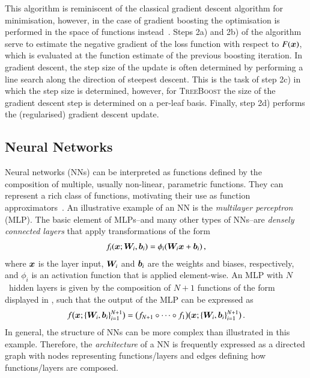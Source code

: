 This algorithm is reminiscent of the classical gradient descent algorithm for
minimisation, however, in the case of gradient boosting the optimisation is
performed in the space of functions instead~\cite{Friedman:2001wbq}. Steps 2a)
and 2b) of the algorithm serve to estimate the negative gradient of the loss
function with respect to $F(\bm{x})$, which is evaluated at the function
estimate of the previous boosting iteration. In gradient descent, the step size
of the update is often determined by performing a line search along the
direction of steepest descent. This is the task of step 2c) in which the step
size is determined, however, for \textsc{TreeBoost} the size of the gradient
descent step is determined on a per-leaf basis. Finally, step 2d) performs the
(regularised) gradient descent update.


\subsection{Neural Networks}%
\label{sec:neural_networks}

Neural networks (NNs) can be interpreted as functions defined by the composition
of multiple, usually non-linear, parametric functions. They can represent a rich
class of functions, motivating their use as function
approximators~\cite{hornik1989multilayer}. An illustrative example of an NN is
the \emph{multilayer perceptron} (MLP). The basic element of MLPs--and many
other types of NNs--are \emph{densely connected layers} that apply
transformations of the form
\begin{align}
  f_i(\bm{x}; \bm{W}_i, \bm{b}_i) = \phi_i(\bm{W}_i \bm{x} + \bm{b}_i) \,\text{,}
  \label{eq:dense_layer}
\end{align}
where $\bm{x}$ is the layer input, $\bm{W}_i$ and $\bm{b}_i$ are the
weights and biases, respectively, and $\phi_i$ is an activation function that is
applied element-wise. An MLP with $N$~hidden layers is given by the composition
of $N + 1$ functions of the form displayed in , such that
the output of the MLP can be expressed as
\begin{align*}
  f\bigl( \bm{x}; \{\bm{W}_{i},\bm{b}_{i} \}_{i=1}^{N+1} \bigr)
  = \bigl( f_{N+1} \circ \dots \circ f_{1} \bigr)
  \bigl( \bm{x}; \{\bm{W}_i, \bm{b}_i\}_{i=1}^{N+1} \bigr)
  \,\text{.}
\end{align*}
In general, the structure of NNs can be more complex than illustrated in this
example. Therefore, the \emph{architecture} of a NN is frequently expressed as a
directed graph with nodes representing functions/layers and edges defining how
functions/layers are composed.


